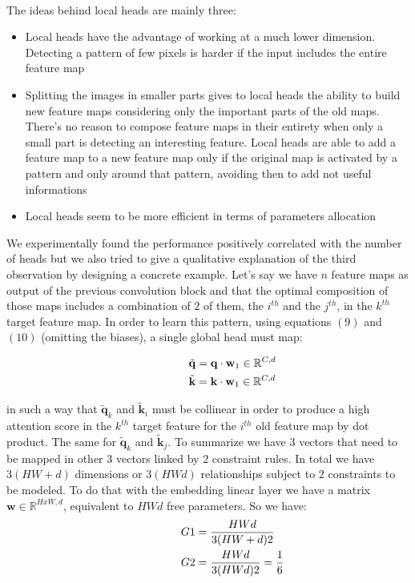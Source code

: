 \documentclass[fleqn,10pt]{SelfArx}
\begin{document}
\

The ideas behind local heads are mainly three:
\begin{itemize}
 \item Local heads have the advantage of working at a much lower dimension. Detecting a pattern of few pixels is harder if the input includes the entire feature map
 \item Splitting the images in smaller parts gives to local heads the ability to build new feature maps considering only the important parts of the old maps. There's no reason to compose feature maps in their entirety when only a small part is detecting an interesting feature. Local heads are able to add a feature map to a new feature map only if the original map is activated by a pattern and only around that pattern, avoiding then to add not useful informations
 \item Local heads seem to be more efficient in terms of parameters allocation
\end{itemize}

We experimentally found the performance positively correlated with the number of heads but we also tried to give a qualitative explanation of the third observation by designing a concrete example. Let's say we have $n$ feature maps as output of the previous convolution block and that the optimal composition of those maps includes a combination of $2$ of them, the  $i^{th}$ and the $j^{th}$, in the $k^{th}$ target feature map. In order to learn this pattern, using equations $(9)$ and $(10)$ (omitting the biases), a single global head must map:

\begin{align}
             & \hspace{1.55cm} \tilde{\mathbf{q}} = \mathbf{q} \cdot \mathbf{w}_{1} \in \mathbb{R}^{C,d} \nonumber \\
             & \hspace{1.55cm} \tilde{\mathbf{k}} = \mathbf{k} \cdot \mathbf{w}_{1} \in \mathbb{R}^{C,d} \nonumber
\end{align}

in such a way that $\tilde{\mathbf{q}}_k$ and $\tilde{\mathbf{k}}_i$ must be collinear in order to produce a high attention score in the $k^{th}$ target feature for the $i^{th}$ old feature map by dot product. The same for $\tilde{\mathbf{q}}_k$ and $\tilde{\mathbf{k}}_j$.
To summarize we have $3$ vectors that need to be mapped in other $3$ vectors linked by $2$ constraint rules. In total we have $3(HW + d)$ dimensions or $3(HWd)$ relationships subject to $2$ constraints  to be modeled. To do that with the embedding linear layer we have a matrix $\mathbf{w} \in \mathbb{R}^{HxW,d}$, equivalent to $HWd$ free parameters. So we have: 
\begin{align}
             & \hspace{1.55cm} G1 = \frac{HWd}{3(HW + d)2} \\
             & \hspace{1.55cm} G2 = \frac{HWd}{3(HWd)2} = \frac{1}{6}
\end{align}
\end{document}
